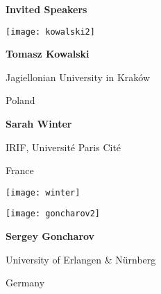 \documentclass[a3paper, 12pt]{article}
\newcommand*\nfont{\fontsize{16}{19}\selectfont}
\begin{document}
\hfill
\begin{minipage}[t]{.43\linewidth}
  \nfont%
  \hfill {\Large \bf Invited Speakers}

  \medskip

  \begin{minipage}{.2\linewidth}
    \texttt{[image: kowalski2]}
  \end{minipage}
  \hfill
  \begin{minipage}{.75\linewidth}
    \textbf{Tomasz Kowalski}

    Jagiellonian University in Kraków

    Poland
  \end{minipage}

  \medskip

  
  \begin{minipage}{.75\linewidth}
    \flushright%
    \textbf{Sarah Winter}

    IRIF, Université Paris Cité

    France
  \end{minipage}
  \hfill
  \begin{minipage}{.2\linewidth}
    \texttt{[image: winter]}
  \end{minipage}

  \medskip

  
  \begin{minipage}{.2\linewidth}
    \texttt{[image: goncharov2]}
  \end{minipage}
  \hfill
  \begin{minipage}{.75\linewidth}
    \textbf{Sergey Goncharov}

    University of Erlangen \& Nürnberg

    Germany
  \end{minipage}


\end{minipage}
\end{document}
